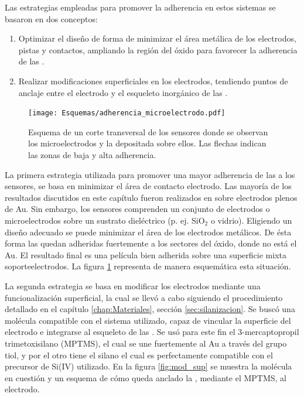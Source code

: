              Las estrategias empleadas para promover la adherencia en estos sistemas se basaron en dos conceptos:
				\begin{enumerate}

					\item Optimizar el diseño de forma de minimizar el área metálica de los electrodos, pistas y contactos, ampliando la región del óxido para favorecer la adherencia de las \pdm.

					\item Realizar modificaciones superficiales en los electrodos, tendiendo puntos de anclaje entre el electrodo y el esqueleto inorgánico de las \pdm.

					\end{enumerate}
					
					\begin{figure}[!b]
					\begin{center}
					\texttt{[image: Esquemas/adherencia\_microelectrodo.pdf]}
					\caption[Adherencia a los microelectrodos.]{Esquema de un corte transversal de los sensores donde se observan los microelectrodos y la \pdm\space depositada sobre ellos. Las flechas indican las zonas de baja y alta adherencia.}
					\label{fig:adherencia_microelectrodo}
					\end{center}
					\end{figure}

			 La primera estrategia utilizada para promover una mayor adherencia de las \pdm\space a los sensores, se basa en minimizar el área de contacto electrodo\textbar\pdm. Las mayoría de los resultados discutidos en este capítulo fueron realizados en \pdm\space sobre electrodos plenos de Au. Sin embargo, los sensores comprenden un conjunto de electrodos o microelectrodos sobre un sustrato dieléctrico (p. ej. SiO$_2$ o vidrio). Eligiendo un diseño adecuado se puede minimizar el área de los electrodos metálicos. De ésta forma las \pdm\space quedan adheridas fuertemente a los sectores del óxido, donde no está el Au. El resultado final es una película bien adherida sobre una superficie mixta soporte\textbar electrodos.  La figura \ref{fig:adherencia_microelectrodo} representa de manera esquemática esta situación.
					
			 La segunda estrategia se basa en modificar los electrodos mediante una funcionalización superficial, la cual se llevó a cabo siguiendo el procedimiento detallado en el capítulo \ref{chap:Materiales}, sección \ref{sec:silanizacion}. Se buscó una molécula compatible con el sistema utilizado, capaz de vincular la superficie del electrodo e integrarse al esqueleto de las \pdm. Se usó para este fin el 3-mercaptopropil trimetoxisilano (MPTMS), el cual se une fuertemente al Au a través del grupo tiol\cite{Gosser,Byun2013}, y por el otro tiene el silano el cual es perfectamente compatible con el precursor de Si(IV) utilizado\cite{Wu2014,Wu2013,Chen2011}. En la figura \ref{fig:mod_sup} se muestra la molécula en cuestión y un esquema de cómo queda anclado la \pdm, mediante el MPTMS, al electrodo.

